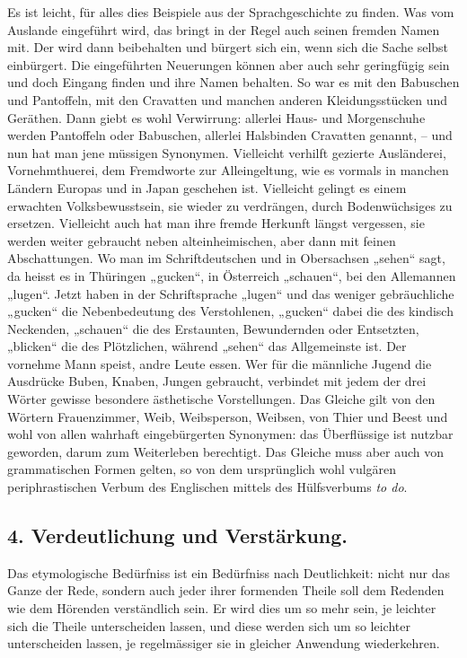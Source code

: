 {Es ist leicht, für alles dies Beispiele aus der Sprachgeschichte zu finden. Was vom Auslande eingeführt wird, das bringt in der Regel auch seinen fremden Namen mit. Der wird dann beibehalten und bürgert sich ein, wenn sich die Sache selbst einbürgert. Die eingeführten Neuerungen können aber auch sehr geringfügig sein und doch Eingang \label{fp.237} finden und ihre Namen behalten. So war es mit den Babuschen und Pantoffeln, mit den Cravatten und manchen anderen Kleidungsstücken und Geräthen. Dann giebt es wohl Verwirrung: allerlei Haus- und Morgenschuhe werden Pantoffeln oder Babuschen, allerlei Halsbinden Cravatten genannt, – und nun hat man jene müssigen Synonymen. Vielleicht verhilft gezierte Ausländerei, Vornehmthuerei, dem Fremdworte zur Alleingeltung, wie es vormals in manchen Ländern Europas und in Japan geschehen ist. Vielleicht gelingt es einem erwachten Volksbewusstsein, sie wieder zu verdrängen, durch Bodenwüchsiges zu ersetzen. Vielleicht auch hat man ihre fremde Herkunft längst vergessen, sie werden weiter gebraucht neben  alteinheimischen, aber dann mit feinen Abschattungen. Wo man im Schriftdeutschen und in Obersachsen „sehen“ sagt, da heisst es in Thüringen „gucken“, in Österreich „schauen“, bei den Allemannen „lugen“. Jetzt haben in der Schriftsprache „lugen“ und das weniger gebräuchliche „gucken“ die Nebenbedeutung des Verstohlenen, „gucken“ dabei die des kindisch Neckenden, „schauen“ die des Erstaunten, Bewundernden oder Entsetzten, „blicken“ die des Plötzlichen, während „sehen“ das Allgemeinste ist. Der vornehme Mann speist, andre Leute essen. Wer für die männliche Jugend die Ausdrücke Buben, Knaben, Jungen gebraucht, verbindet mit jedem der drei Wörter gewisse besondere ästhetische Vorstellungen. Das Gleiche gilt von den Wörtern Frauenzimmer, Weib, Weibsperson, Weibsen, von Thier und Beest und wohl von allen wahrhaft eingebürgerten Synonymen: das Überflüssige ist nutz\-\label{sp.239}bar geworden, darum zum Weiterleben berechtigt. Das Gleiche muss aber auch von grammatischen Formen gelten, so von dem ursprünglich wohl vulgären periphrastischen Verbum des Englischen mittels des Hülfsverbums \textit{to do}.

\subsection*{4. Verdeutlichung und Verstärkung.}\label{III.II.II.12.4}
Das etymologische Bedürfniss ist ein Bedürfniss nach Deutlichkeit: nicht nur das Ganze der Rede, sondern auch jeder ihrer formenden Theile soll dem Redenden wie dem Hörenden verständlich sein. Er wird dies um so mehr sein, je leichter sich die Theile unterscheiden lassen, und diese werden sich um so leichter unterscheiden lassen, je regelmässiger sie in gleicher Anwendung wiederkehren.

}
